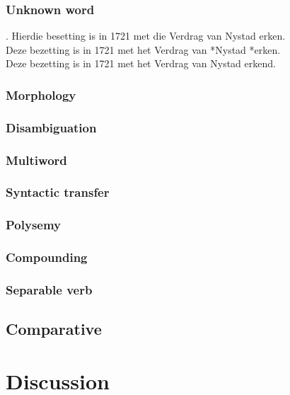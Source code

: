 \documentclass[11pt]{article}
\begin{document}
\subsubsection{Unknown word}

\ex. \label{ex:exist} 
    Hierdie besetting is in 1721 met die Verdrag van Nystad erken. \\
    Deze bezetting is in 1721 met het Verdrag van *Nystad *erken. \\
    Deze bezetting is in 1721 met het Verdrag van Nystad erkend. \\

\subsubsection{Morphology}
\subsubsection{Disambiguation}
\subsubsection{Multiword}
\subsubsection{Syntactic transfer}
\subsubsection{Polysemy}
\subsubsection{Compounding}
\subsubsection{Separable verb}

\subsection{Comparative}



\section{Discussion}
\end{document}
